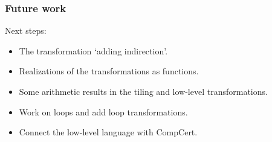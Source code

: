 \begin{frame}[fragile]
\frametitle{Future work}

Next steps:
\\[0.7em]
\begin{itemize}
	\setlength\itemsep{1.5em}
	\item The transformation `adding indirection'. \pause
	\item Realizations of the transformations as functions. \pause
	\item Some arithmetic results in the tiling and low-level transformations. \pause
	\item Work on loops and add loop transformations.\pause
	\item Connect the low-level language with CompCert.
\end{itemize}

\end{frame}


\frame{\titlepage}



